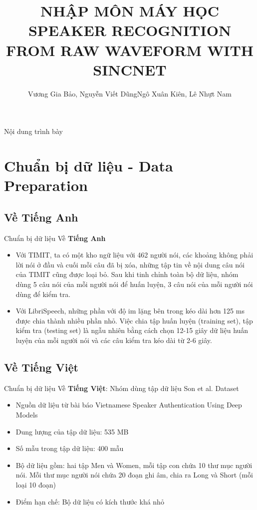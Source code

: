 \documentclass[notheorems, aspectratio=54]{beamer}
\author{Vương Gia Bảo, Nguyễn Viết Dũng\newline Ngô Xuân Kiên, Lê Nhựt Nam}
\title{NHẬP MÔN MÁY HỌC \newline SPEAKER RECOGNITION FROM \newline RAW WAVEFORM WITH SINCNET}
\institute{Đại học Khoa học Tự nhiên, Đại học Quốc gia TP HCM}
\begin{document}
\begin{frame}
\titlepage
\end{frame}

\begin{frame}{Nội dung trình bày}
\tableofcontents
\end{frame}
\section{Chuẩn bị dữ liệu - Data Preparation}
\subsection{Về \textbf{Tiếng Anh}}
\begin{frame}{Chuẩn bị dữ liệu}
	Về \textbf{Tiếng Anh}
	\begin{itemize}
		\item Với TIMIT, ta có một kho ngữ liệu với 462 người nói, các khoảng không phải lời nói ở đầu và cuối mỗi câu đã bị xóa, những tập tin về nội dung câu nói của TIMIT cũng được loại bỏ. Sau khi tinh chỉnh toàn bộ dữ liệu, nhóm dùng 5 câu nói của mỗi người nói để huấn luyện, 3 câu nói của mỗi người nói dùng để kiểm tra.
		\item Với LibriSpeech, những phần với độ im lặng bên trong kéo dài hơn 125 ms được
		chia thành nhiều phần nhỏ. Việc chia tập huấn luyện (training set), tập kiểm tra (testing set) là ngẫu nhiên bằng cách chọn 12-15 giây dữ liệu huấn luyện của mỗi người nói và các câu kiểm tra kéo dài từ 2-6 giây.
	\end{itemize}
\end{frame}
\subsection{Về \textbf{Tiếng Việt}}
\begin{frame}{Chuẩn bị dữ liệu}
	Về \textbf{Tiếng Việt}: Nhóm dùng tập dữ liệu Son et al. Dataset
	\begin{itemize}
		\item Nguồn dữ liệu từ bài báo Vietnamese Speaker Authentication Using Deep Models
		\item Dung lượng của tập dữ liệu: 535 MB
		\item Số mẫu trong tập dữ liệu: 400 mẫu
		\item Bộ dữ liệu gồm: hai tập Men và Women, mỗi tập con chứa 10 thư mục người nói. Mỗi thư mục người nói chứa 20 đoạn ghi âm, chia ra Long và Short (mỗi loại 10 đoạn)
		\item Điểm hạn chế: Bộ dữ liệu có kích thước khá nhỏ
	\end{itemize}
\end{frame}
\end{document}
